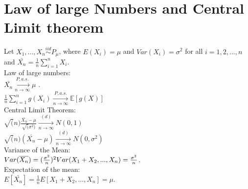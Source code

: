 \section{Law of large Numbers and Central Limit theorem}
Let $X_1, ..., X_n \stackrel{iid}{\sim} P_{\mu}$, where $E(X_i)=\mu$ and $Var(X_i)=\sigma^2$ for all $i=1,2,...,n$ and $\bar{X_n}= \frac{1}{n} \sum_{i=1}^{n} X_i$.\\

Law of large numbers:\\

$\bar{X_n} \xrightarrow[n \rightarrow \infty]{P, a.s.} \mu$ .\\

$ \frac{1}{n} \sum_{i=1}^{n} g(X_i) \xrightarrow[n \rightarrow \infty]{P, a.s.} \mathbb{E}[g(X)]$\\

Central Limit Theorem:\\

$\sqrt(n)\frac{\bar{X_n}-\mu}{\sqrt(\sigma^2)} \xrightarrow[n \rightarrow \infty]{(d)} N(0,1)$\\

$\sqrt(n)(\bar{X_n}-\mu) \xrightarrow[n \rightarrow \infty]{(d)} N(0,\sigma^2)$\\

Variance of the Mean:\\

$Var(\overline{X_n})=\\
(\frac{\sigma^2}{n})^2 Var(X_1 + X_2,...,X_n) =  \frac{\sigma^2}{n}$.\\

Expectation of the mean:\\

$E[\bar{X_n}]=\frac{1}{n}E[X_1 + X_2,...,X_n] = \mu$.
